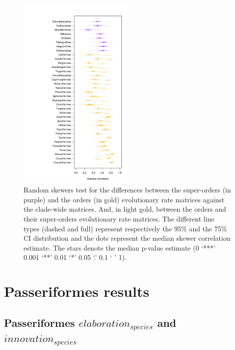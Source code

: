 \documentclass[12pt,a4paper]{article}
\begin{document}
\begin{figure}[H]
\centering
   \includegraphics[width=0.5\textwidth]{Figures/random_skewers.pdf}
\caption{Random skewers test for the differences between the super-orders (in purple) and the orders (in gold) evolutionary rate matrices against the clade-wide matrices. And, in light gold, between the orders and their super-orders evolutionary rate matrices. The different line types (dashed and full) represent respectively the 95\% and the 75\% CI distribution and the dots represent the median skewer correlation estimate. The stars denote the median p-value estimate (0 ‘***’ 0.001 ‘**’ 0.01 ‘*’ 0.05 ‘.’ 0.1 ‘ ’ 1).}
\label{Fig:random_skewers}
\end{figure}

%
%


\newpage
\clearpage
\section{Passeriformes results}

\subsection{Passeriformes $elaboration_{species}$ and $innovation_{species}$}
\end{document}
